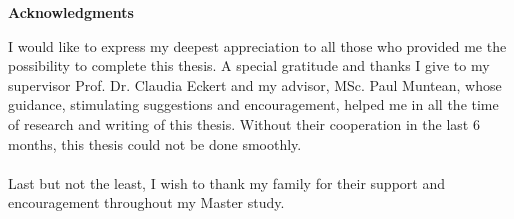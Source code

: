 \clearemptydoublepage
{}
{}	



\vspace*{2cm}

\begin{center}
{\Large \bf Acknowledgments}
\end{center}

\vspace{1cm}




I would like to express my deepest appreciation to all those who provided me the possibility to complete this thesis. A special gratitude and thanks I give to my supervisor Prof. Dr. Claudia Eckert and my advisor, MSc. Paul Muntean, whose guidance, stimulating suggestions and encouragement, helped me in all the time of research and writing of this thesis. Without their cooperation in the last 6 months, this thesis could not be done smoothly.\\ \\
Last but not the least, I wish to thank my family for their support and encouragement throughout my Master study.